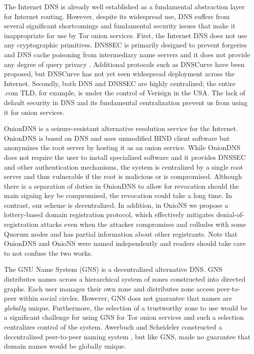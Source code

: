 \documentclass[USenglish,oneside,twocolumn]{article}
\begin{document}
The Internet DNS is already well established as a fundamental abstraction layer for Internet routing. However, despite its widespread use, DNS suffers from several significant shortcomings and fundamental security issues that make it inappropriate for use by Tor onion services. First, the Internet DNS does not use any cryptographic primitives. DNSSEC is primarily designed to prevent forgeries and DNS cache poisoning from intermediary name servers and it does not provide any degree of query privacy \cite{wachs2014censorship}. Additional protocols such as DNSCurve \cite{bernstein2009dnscurve} have been proposed, but DNSCurve has not yet seen widespread deployment across the Internet. Secondly, both DNS and DNSSEC are highly centralized; the entire .com TLD, for example, is under the control of Verisign in the USA. The lack of default security in DNS and its fundamental centralization prevent us from using it for onion services.

OnionDNS \cite{scaife2015oniondns} is a seizure-resistant alternative resolution service for the Internet. OnionDNS is based on DNS and uses unmodified BIND client software but anonymizes the root server by hosting it as an onion service. While OnionDNS does not require the user to install specialized software and it provides DNSSEC and other authentication mechanisms, the system is centralized by a single root server and thus  vulnerable if the root is malicious or is compromised. Although there is a separation of duties in OnionDNS to allow for revocation should the main signing key be compromised, the revocation could take a long time.  In contrast, our scheme is decentralized. In addition, in OnioNS we propose a lottery-based domain registration protocol, which effectively mitigates denial-of-registration attacks even when the attacker compromises and colludes with some Quorum nodes and has partial information about other registrants. Note that OnionDNS and OnioNS were named independently and readers should take care to not confuse the two works.

The GNU Name System \cite{wachs2014censorship} (GNS) is a decentralized alternative DNS. GNS distributes names across a hierarchical system of zones constructed into directed graphs. Each user manages their own zone and distributes zone access peer-to-peer within social circles. However, GNS does not guarantee that names are \emph{globally} unique. Furthermore, the selection of a trustworthy zone to use would be a significant challenge for using GNS for Tor onion services and such a selection centralizes control of the system. Awerbuch and Scheideler constructed a decentralized peer-to-peer naming system \cite{awerbuch2004group}, but like GNS, made no guarantee that domain names would be globally unique.
\end{document}
